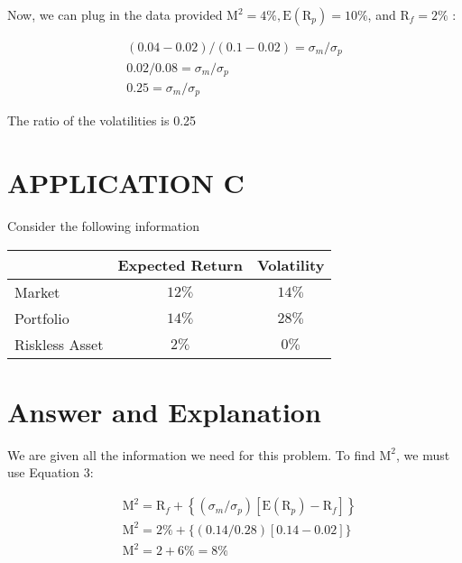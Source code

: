 \documentclass[11pt]{article}
\begin{document}
Now, we can plug in the data provided $\mathrm{M}^{2}=4 \%, \mathrm{E}\left(\mathrm{R}_{p}\right)=10 \%$, and $\mathrm{R}_{f}=2 \%$ :

$$
\begin{gathered}
(0.04-0.02) /(0.1-0.02)=\sigma_{m} / \sigma_{p} \\
0.02 / 0.08=\sigma_{m} / \sigma_{p} \\
0.25=\sigma_{m} / \sigma_{p}
\end{gathered}
$$

The ratio of the volatilities is 0.25

\section*{APPLICATION C}
Consider the following information

\begin{center}
\begin{tabular}{|l|c|c|}
\hline
 & Expected Return & Volatility \\
\hline
Market & $12 \%$ & $14 \%$ \\
\hline
Portfolio & $14 \%$ & $28 \%$ \\
\hline
Riskless Asset & $2 \%$ & $0 \%$ \\
\hline
\end{tabular}
\end{center}

\section*{Answer and Explanation}
We are given all the information we need for this problem. To find $\mathrm{M}^{2}$, we must use Equation 3:

$$
\begin{aligned}
& \mathrm{M}^{2}=\mathrm{R}_{f}+\left\{\left(\sigma_{m} / \sigma_{p}\right)\left[\mathrm{E}\left(\mathrm{R}_{p}\right)-\mathrm{R}_{f}\right]\right\} \\
& \mathrm{M}^{2}=2 \%+\{(0.14 / 0.28)[0.14-0.02]\} \\
& \mathrm{M}^{2}=2+6 \%=8 \%
\end{aligned}
$$
\end{document}
